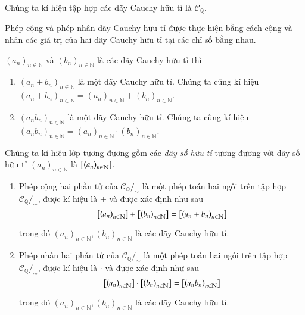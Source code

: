 Chúng ta kí hiệu tập hợp các dãy Cauchy hữu tỉ là $\mathscr{C}_{\mathbb{Q}}$.

Phép cộng và phép nhân dãy Cauchy hữu tỉ được thực hiện bằng cách cộng và nhân các giá trị của hai dãy Cauchy hữu tỉ tại các chỉ số bằng nhau.

\begin{theorem}\label{theorem:addition-and-multiplication-of-rational-cauchy-sequences}
    ${(a_{n})}_{n\in\mathbb{N}}$ và ${(b_{n})}_{n\in\mathbb{N}}$ là các dãy Cauchy hữu tỉ thì
    \begin{enumerate}[label={(\roman*)}]
        \item ${(a_{n} + b_{n})}_{n\in\mathbb{N}}$ là một dãy Cauchy hữu tỉ. Chúng ta cũng kí hiệu ${(a_{n} + b_{n})}_{n\in\mathbb{N}} = {(a_{n})}_{n\in\mathbb{N}} + {(b_{n})}_{n\in\mathbb{N}}$.
        \item ${(a_{n}b_{n})}_{n\in\mathbb{N}}$ là một dãy Cauchy hữu tỉ. Chúng ta cũng kí hiệu ${(a_{n}b_{n})}_{n\in\mathbb{N}} = {(a_{n})}_{n\in\mathbb{N}}\cdot {(b_{n})}_{n\in\mathbb{N}}$.
    \end{enumerate}
\end{theorem}

\begin{definition}
    Chúng ta kí hiệu lớp tương đương gồm các \textit{dãy số hữu tỉ} tương đương với dãy số hữu tỉ ${(a_{n})}_{n\in\mathbb{N}}$ là $\left[{\left({a_{n}}\right)}_{{n}\in\mathbb{N}}\right]$.

    \begin{enumerate}[label={(\roman*)}]
        \item Phép cộng hai phần tử của $\mathscr{C}_{\mathbb{Q}}/_{\sim}$ là một phép toán hai ngôi trên tập hợp $\mathscr{C}_{\mathbb{Q}}/_{\sim}$, được kí hiệu là $+$ và được xác định như sau
              \[
                  \left[{\left({a_{n}}\right)}_{{n}\in\mathbb{N}}\right] + \left[{\left({b_{n}}\right)}_{{n}\in\mathbb{N}}\right] = \left[{\left({a_{n} + b_{n}}\right)}_{{n}\in\mathbb{N}}\right]
              \]

              trong đó ${(a_{n})}_{n\in\mathbb{N}}, {(b_{n})}_{n\in\mathbb{N}}$ là các dãy Cauchy hữu tỉ.
        \item Phép nhân hai phần tử của $\mathscr{C}_{\mathbb{Q}}/_{\sim}$ là một phép toán hai ngôi trên tập hợp $\mathscr{C}_{\mathbb{Q}}/_{\sim}$, được kí hiệu là $\cdot$ và được xác định như sau
              \[
                  \left[{\left({a_{n}}\right)}_{{n}\in\mathbb{N}}\right] \cdot \left[{\left({b_{n}}\right)}_{{n}\in\mathbb{N}}\right] = \left[{\left({a_{n}b_{n}}\right)}_{{n}\in\mathbb{N}}\right]
              \]

              trong đó ${(a_{n})}_{n\in\mathbb{N}}, {(b_{n})}_{n\in\mathbb{N}}$ là các dãy Cauchy hữu tỉ.
    \end{enumerate}
\end{definition}

